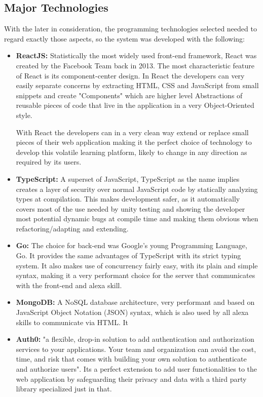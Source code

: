 \subsection{Major Technologies}
With the later in consideration, the programming technologies selected needed to regard
exactly those aspects, so the system was developed with the following:


\begin{itemize}
\item \textbf{ReactJS:} Statistically the most widely used front-end framework, React
    was created by the Facebook Team back in 2013. The most characteristic feature 
    of React is its component-center design. In React the developers can very easily
    separate concerns by extracting HTML, CSS and JavaScript from small snippets and
    create "Components" which are higher level Abstractions of reusable pieces of code
    that live in the application in a very Object-Oriented style.

    With React the developers can in a very clean way extend or replace small pieces 
    of their web application making it the perfect choice of technology to develop this
    volatile learning platform, likely to change in any direction as required by its
    users.

\item \textbf{TypeScript:} A superset of JavaScript, TypeScript as the name implies
    creates a layer of security over normal JavaScript code by statically analyzing 
    types at compilation. This makes development safer, as it automatically covers 
    most of the use needed by unity testing and showing the developer most potential dynamic 
    bugs at compile time and making them obvious when refactoring/adapting and 
    extending.


\item \textbf{Go:} The choice for back-end was Google's young Programming Language, Go.
    It provides the same advantages of TypeScript with its strict typing system. 
    It also makes use of concurrency fairly easy, with its plain and simple syntax, making
    it a very performant choice for the server that communicates with the front-end 
    and alexa skill.

\item \textbf{MongoDB:} A NoSQL database architecture, very performant and based on
    JavaScript Object Notation (JSON) syntax, which is also used by all alexa skills to
    communicate via HTML. It 

\item \textbf{Auth0:} "a flexible, drop-in solution to add authentication and 
    authorization services to your applications. Your team and organization can 
    avoid the cost, time, and risk that comes with building your own solution to 
    authenticate and authorize users". Its a perfect extension to add user 
    functionalities to the web application by safeguarding their privacy and data with
    a third party library specialized just in that.


\end{itemize}
